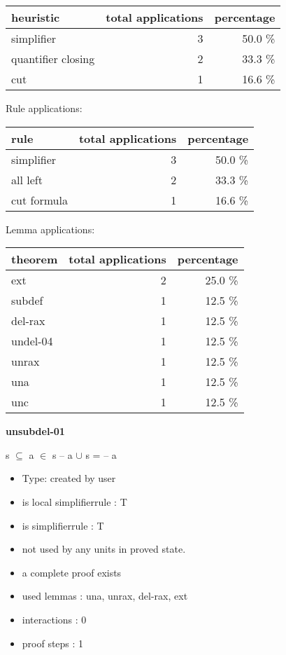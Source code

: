 \documentclass[a4paper]{article}
\begin{document}
\begin{supertabular}{l|r|r}
heuristic	& total applications & percentage \\ \hline
simplifier & 3 & 50.0 \% \\
quantifier closing & 2 & 33.3 \% \\
cut & 1 & 16.6 \% \\

\end{supertabular}

Rule applications:

\begin{supertabular}{l|r|r}
rule	        & total applications & percentage \\ \hline
simplifier & 3 & 50.0 \% \\
all left & 2 & 33.3 \% \\
cut formula & 1 & 16.6 \% \\

\end{supertabular}

Lemma applications:

\begin{supertabular}{l|r|r}
theorem	        & total applications & percentage \\ \hline
ext & 2 & 25.0 \% \\
subdef & 1 & 12.5 \% \\
del-rax & 1 & 12.5 \% \\
undel-04 & 1 & 12.5 \% \\
unrax & 1 & 12.5 \% \\
una & 1 & 12.5 \% \\
unc & 1 & 12.5 \% \\

\end{supertabular}
\pagebreak

{\LARGE\bf unsubdel-01}\label{lemma-unsubdel-01}

\medskip

 \Fol s $\subseteq$  \And \Not a $\in$ s \Imp {} -- a $\cup$ s =  -- a

\begin{itemize}

\item Type: created by user

\item is local simplifierrule : T
\item is simplifierrule : T
\item not used by any units in proved state.
\item       a complete proof exists
\item       used lemmas  : una, unrax, del-rax, ext
\item       interactions : 0
\item       proof steps  : 1
\end{itemize}
\end{document}

